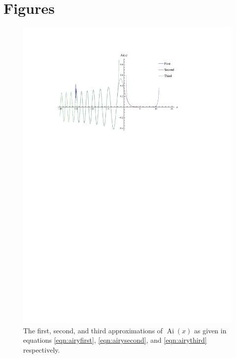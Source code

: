 \documentclass[]{article}
\newcommand{\Ai}[1]{\ensuremath{\operatorname{Ai}({#1})}}
\begin{document}
\section{Figures}\label{sec:figures}

\begin{figure}[H]
	\hspace*{-0.15\textwidth}
	\centering
	\includegraphics[scale=1.3]{approximations}
	\caption{The first, second, and third approximations of \Ai{x} as given in equations \ref{eqn:airyfirst}, \ref{eqn:airysecond}, and \ref{eqn:airythird} respectively.}
	\label{fig:approximations}
\end{figure}
\end{document}
